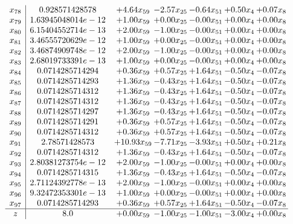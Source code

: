 \documentclass[8pt]{article}
\begin{document}
\[\begin{array}{c| c c@{\hskip 2pt} c@{\hskip 2pt} c@{\hskip 2pt} c@{\hskip 2pt} c@{\hskip 2pt} }
 x_{78}   &  0.928571428578 & +  4.64 x_{59} & -2.57 x_{25} & -0.64 x_{51} & +  0.50 x_{4} & +  0.07 x_{8}\\
 x_{79}   &  1.63945048014e-12 & +  1.00 x_{59} & +  0.00 x_{25} & -0.00 x_{51} & +  0.00 x_{4} & +  0.00 x_{8}\\
 x_{80}   &  6.15404552714e-13 & +  2.00 x_{59} & -1.00 x_{25} & -0.00 x_{51} & +  0.00 x_{4} & +  0.00 x_{8}\\
 x_{81}   &  3.46555720629e-12 & +  1.00 x_{59} & +  0.00 x_{25} & -0.00 x_{51} & +  0.00 x_{4} & +  0.00 x_{8}\\
 x_{82}   &  3.46874909748e-12 & +  2.00 x_{59} & -1.00 x_{25} & -0.00 x_{51} & +  0.00 x_{4} & +  0.00 x_{8}\\
 x_{83}   &  2.68019733391e-13 & +  1.00 x_{59} & +  0.00 x_{25} & -0.00 x_{51} & +  0.00 x_{4} & +  0.00 x_{8}\\
 x_{84}   &  0.0714285714294 & +  0.36 x_{59} & +  0.57 x_{25} & +  1.64 x_{51} & -0.50 x_{4} & -0.07 x_{8}\\
 x_{85}   &  0.0714285714293 & +  1.36 x_{59} & -0.43 x_{25} & +  1.64 x_{51} & -0.50 x_{4} & -0.07 x_{8}\\
 x_{86}   &  0.0714285714312 & +  1.36 x_{59} & -0.43 x_{25} & +  1.64 x_{51} & -0.50 x_{4} & -0.07 x_{8}\\
 x_{87}   &  0.0714285714312 & +  1.36 x_{59} & -0.43 x_{25} & +  1.64 x_{51} & -0.50 x_{4} & -0.07 x_{8}\\
 x_{88}   &  0.0714285714297 & +  1.36 x_{59} & -0.43 x_{25} & +  1.64 x_{51} & -0.50 x_{4} & -0.07 x_{8}\\
 x_{89}   &  0.0714285714291 & +  0.36 x_{59} & +  0.57 x_{25} & +  1.64 x_{51} & -0.50 x_{4} & -0.07 x_{8}\\
 x_{90}   &  0.0714285714312 & +  0.36 x_{59} & +  0.57 x_{25} & +  1.64 x_{51} & -0.50 x_{4} & -0.07 x_{8}\\
 x_{91}   &  2.78571428573 & + 10.93 x_{59} & -7.71 x_{25} & -3.93 x_{51} & +  0.50 x_{4} & +  0.21 x_{8}\\
 x_{92}   &  0.0714285714312 & +  1.36 x_{59} & -0.43 x_{25} & +  1.64 x_{51} & -0.50 x_{4} & -0.07 x_{8}\\
 x_{93}   &  2.80381273754e-12 & +  2.00 x_{59} & -1.00 x_{25} & -0.00 x_{51} & +  0.00 x_{4} & +  0.00 x_{8}\\
 x_{94}   &  0.0714285714315 & +  1.36 x_{59} & -0.43 x_{25} & +  1.64 x_{51} & -0.50 x_{4} & -0.07 x_{8}\\
 x_{95}   &  2.71124392778e-13 & +  2.00 x_{59} & -1.00 x_{25} & -0.00 x_{51} & +  0.00 x_{4} & +  0.00 x_{8}\\
 x_{96}   &  9.32472353301e-13 & +  1.00 x_{59} & +  0.00 x_{25} & -0.00 x_{51} & +  0.00 x_{4} & +  0.00 x_{8}\\
 x_{97}   &  0.0714285714293 & +  0.36 x_{59} & +  0.57 x_{25} & +  1.64 x_{51} & -0.50 x_{4} & -0.07 x_{8}\\
\hline
z    &  8.0 & +  0.00 x_{59} & -1.00 x_{25} & -1.00 x_{51} & -3.00 x_{4} & +  0.00 x_{8}\\
\end{array}\]
\end{document}
